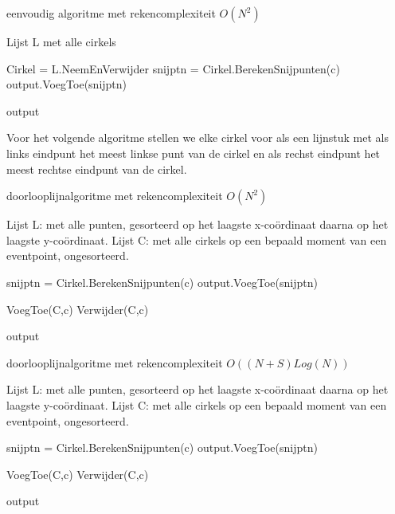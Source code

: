 \documentclass[11pt,a4paper]{article}
\begin{document}
\begin{algorithm}
\caption{eenvoudig algoritme met rekencomplexiteit $O(N^2)$}
\begin{algorithmic}
\State Lijst L met alle cirkels

	\State Cirkel = L.NeemEnVerwijder
	\State snijptn = Cirkel.BerekenSnijpunten(c)
	\State output.VoegToe(snijptn)
	\EndFor
\EndWhile

\Return output
\end{algorithmic}
\end{algorithm}
Voor het volgende algoritme stellen we elke cirkel voor als een lijnstuk met als links eindpunt het meest linkse punt van de cirkel en als rechst eindpunt het meest rechtse eindpunt van de cirkel.
\begin{algorithm}
\caption{doorlooplijnalgoritme met rekencomplexiteit $O(N^2)$}
\begin{algorithmic}
\State Lijst L: met alle punten, gesorteerd op het laagste x-co\"ordinaat daarna op het laagste y-co\"ordinaat.
\State Lijst C: met alle cirkels op een bepaald moment van een eventpoint, ongesorteerd.
	
		\State snijptn = Cirkel.BerekenSnijpunten(c)
		\State output.VoegToe(snijptn)
	
	\State VoegToe(C,c)
	\EndIf
	\State Verwijder(C,c)
	\EndIf
\EndFor

\Return output
\end{algorithmic}
\end{algorithm}
\begin{algorithm}
\caption{doorlooplijnalgoritme met rekencomplexiteit $O((N+S)Log(N))$}
\begin{algorithmic}
\State Lijst L: met alle punten, gesorteerd op het laagste x-co\"ordinaat daarna op het laagste y-co\"ordinaat.
\State Lijst C: met alle cirkels op een bepaald moment van een eventpoint, ongesorteerd.
	
		\State snijptn = Cirkel.BerekenSnijpunten(c)
		\State output.VoegToe(snijptn)
	
	\State VoegToe(C,c)
	\EndIf
	\State Verwijder(C,c)
	\EndIf
\EndFor

\Return output
\end{algorithmic}
\end{algorithm}
\end{document}

